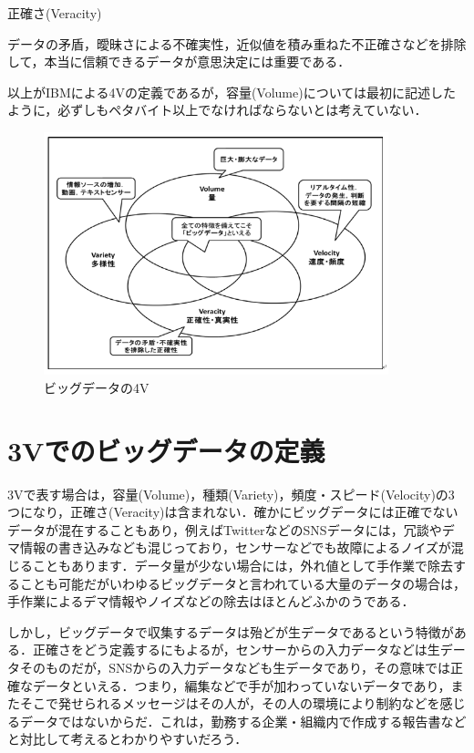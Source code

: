 正確さ(Veracity)

データの矛盾，曖昧さによる不確実性，近似値を積み重ねた不正確さなどを排除して，本当に信頼できるデータが意思決定には重要である．



以上がIBMによる4Vの定義であるが，容量(Volume)については最初に記述したように，必ずしもペタバイト以上でなければならないとは考えていない．


\begin{figure}[H]
\centering
\includegraphics[width=10cm]{bigdata4v.png}
\caption{ビッグデータの4V}\label{サンプル図}
\end{figure}


\section{3Vでのビッグデータの定義}

3Vで表す場合は，容量(Volume)，種類(Variety)，頻度・スピード(Velocity)の3つになり，正確さ(Veracity)は含まれない．確かにビッグデータには正確でないデータが混在することもあり，例えばTwitterなどのSNSデータには，冗談やデマ情報の書き込みなども混じっており，センサーなどでも故障によるノイズが混じることもあります．データ量が少ない場合には，外れ値として手作業で除去することも可能だがいわゆるビッグデータと言われている大量のデータの場合は，手作業によるデマ情報やノイズなどの除去はほとんどふかのうである．

しかし，ビッグデータで収集するデータは殆どが生データであるという特徴がある．正確さをどう定義するにもよるが，センサーからの入力データなどは生データそのものだが，SNSからの入力データなども生データであり，その意味では正確なデータといえる．つまり，編集などで手が加わっていないデータであり，またそこで発せられるメッセージはその人が，その人の環境により制約などを感じるデータではないからだ．これは，勤務する企業・組織内で作成する報告書などと対比して考えるとわかりやすいだろう．

